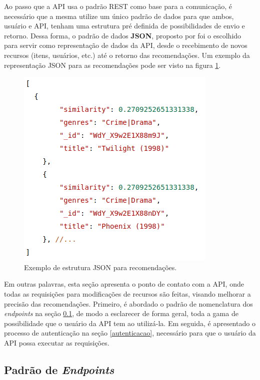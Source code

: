 Ao passo que a API usa o padrão REST como base para a comunicação, é necessário que a mesma utilize um único padrão de dados para que ambos, usuário e API, tenham uma estrutura pré definida de possibilidades de envio e retorno. Dessa forma, o padrão de dados \textbf{JSON}, proposto por  foi o escolhido para servir como representação de dados da API, desde o recebimento de novos recursos (itens, usuários, etc.) até o retorno das recomendações. Um exemplo da representação JSON para as recomendações pode ser visto na figura \ref{json_example}.

\begin{figure}[h!tp]
	\caption{\label{json_example}Exemplo de estrutura JSON para recomendações.}
	\begin{center}
		\includegraphics[scale=0.75]{images/json_example.png}
	\end{center}
	\hspace{5.5cm}{Fonte: O Autor.}
\end{figure}

Em outras palavras, esta seção apresenta o ponto de contato com a API, onde todas as requisições para modificações de recursos são feitas, visando melhorar a precisão das recomendações. Primeiro, é abordado o padrão de nomenclatura dos \textit{endpoints} na seção \ref{endpoints}, de modo a esclarecer de forma geral, toda a gama de possibilidade que o usuário da API tem ao utilizá-la. Em seguida, é apresentado o processo de autenticação na seção \ref{autenticacao}, necessário para que o usuário da API possa executar as requisições.

\subsection{Padrão de \textit{Endpoints}} \label{endpoints}

